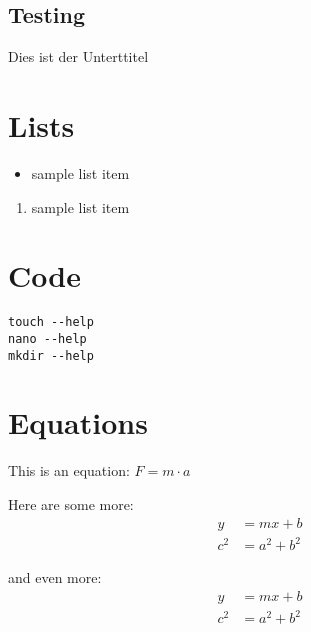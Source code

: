 
\subsection{Testing}
Dies ist der Unterttitel

\section{Lists}
\begin{itemize}
	\item sample list item
\end{itemize}

\begin{enumerate}
	\item sample list item
\end{enumerate}

\section{Code}
\begin{lstlisting}
touch --help
nano --help
mkdir --help
\end{lstlisting}




\section{Equations}
This is an equation: $F = m \cdot a$

Here are some more:
\begin{align}
	y &= mx + b \\
	c^2 &= a^2 + b^2
\end{align}

and even more:
\begin{align*}
	y &= mx + b \\
	c^2 &= a^2 + b^2
\end{align*}

